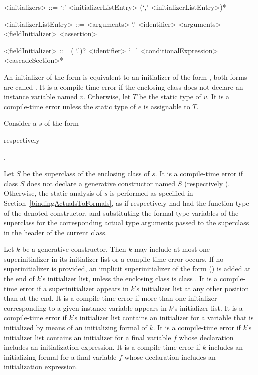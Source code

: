 \documentclass[makeidx]{article}
\begin{document}
\begin{grammar}
<initializers> ::= `:' <initializerListEntry> (`,' <initializerListEntry>)*

<initializerListEntry> ::= \SUPER{} <arguments>
  \alt \SUPER{} `.' <identifier> <arguments>
  \alt <fieldInitializer>
  \alt <assertion>

<fieldInitializer> ::= \gnewline{}
  (\THIS{} `.')? <identifier> `=' <conditionalExpression> <cascadeSection>*
\end{grammar}

\LMHash{}%
An initializer of the form  is equivalent to
an initializer of the form ,
both forms are called .
It is a compile-time error if the enclosing class does not declare an instance variable named $v$.
Otherwise, let $T$ be the static type of $v$.
It is a compile-time error unless the static type of $e$ is assignable to $T$.

\LMHash{}%
Consider a  $s$ of the form

respectively

.

\noindent{}%
Let $S$ be the superclass of the enclosing class of $s$.
It is a compile-time error if class $S$ does not declare a generative constructor named $S$ (respectively ).
Otherwise, the static analysis of $s$ is performed as specified in Section~\ref{bindingActualsToFormals},
as if \code{\SUPER{}} respectively 
had had the function type of the denoted constructor,
and substituting the formal type variables of the superclass
for the corresponding actual type arguments passed to the superclass
in the header of the current class.

\LMHash{}%
Let $k$ be a generative constructor.
Then $k$ may include at most one superinitializer in its initializer list or a compile-time error occurs.
If no superinitializer is provided, an implicit superinitializer of the form \SUPER{}() is added at the end of $k$'s initializer list,
unless the enclosing class is class .
It is a compile-time error if a superinitializer appears in $k$'s initializer list at any other position than at the end.
It is a compile-time error if more than one initializer corresponding to a given instance variable appears in $k$'s initializer list.
It is a compile-time error if $k$'s initializer list contains an initializer for a variable that is initialized by means of an initializing formal of $k$.
It is a compile-time error if $k$'s initializer list contains an initializer for a final variable $f$ whose declaration includes an initialization expression.
It is a compile-time error if $k$ includes an initializing formal for a final variable $f$ whose declaration includes an initialization expression.
\end{document}
